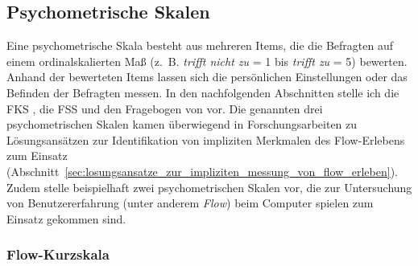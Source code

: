 \subsection{Psychometrische Skalen} 

\label{sub:psychometrische_skalen}

Eine psychometrische Skala besteht aus mehreren Items, die die Befragten auf einem ordinalskalierten Maß (z.~B. \emph{trifft nicht zu} = 1 bis \emph{trifft zu} = 5) bewerten. Anhand der bewerteten Items lassen sich die persönlichen Einstellungen oder das Befinden der Befragten messen. In den nachfolgenden Abschnitten stelle ich die \ac{FKS} \citep{Rheinberg2003}, die \ac{FSS} \citep{Jackson1996} und den Fragebogen von \citet{Keller2008} vor. Die genannten drei psychometrischen Skalen kamen überwiegend in Forschungsarbeiten zu Lösungsansätzen zur Identifikation von impliziten Merkmalen des Flow-Erlebens zum Einsatz (Abschnitt~\ref{sec:losungsansatze_zur_impliziten_messung_von_flow_erleben}). Zudem stelle beispielhaft zwei psychometrischen Skalen vor, die zur Untersuchung von Benutzererfahrung (unter anderem \emph{Flow}) beim Computer spielen zum Einsatz gekommen sind. 

\subsubsection{Flow-Kurzskala} 

\label{ssub:flow_kurzskala}

